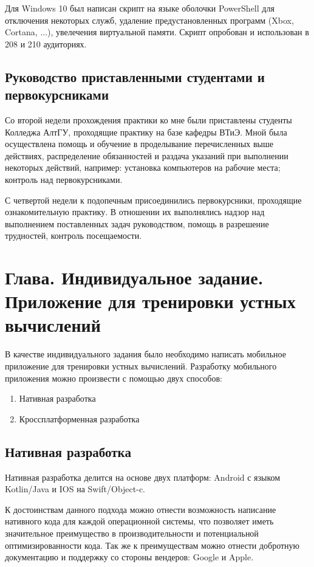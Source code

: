 \documentclass[14pt, oneside]{altsu-report}
\begin{document}
Для Windows 10 был написан скрипт на языке оболочки PowerShell для отключения некоторых служб, удаление предустановленных программ (Xbox, Cortana, ...), увелечения виртуальной памяти. Скрипт опробован и использован в 208 и 210 аудиториях.

\section{Руководство приставленными студентами и первокурсниками}
Со второй недели прохождения практики ко мне были приставлены студенты Колледжа АлтГУ, проходящие практику на базе кафедры ВТиЭ. Мной была осуществлена помощь и обучение в проделывание перечисленных выше действиях, распределение обязанностей и раздача указаний при выполнении некоторых действий, например: установка компьютеров на рабочие места; контроль над первокурсниками.

С четвертой недели к подопечным присоединились первокурсники, проходящие ознакомительную практику. В отношении их выполнялись надзор над выполнением поставленных задач руководством, помощь в разрешение трудностей, контроль посещаемости.

\chapter{Глава. Индивидуальное задание. Приложение для тренировки устных вычислений}
В качестве индивидуального задания было необходимо написать мобильное приложение для тренировки устных вычислений. 
Разработку мобильного приложения можно произвести с помощью двух способов:
\begin{enumerate}
  \item Нативная разработка \cite{nativDev}
  \item Кроссплатформенная разработка \cite{crosDev}
\end{enumerate}
\section*{Нативная разработка}
Нативная разработка делится на основе двух платформ: Android с языком Kotlin/Java и IOS на Swift/Object-c.

К достоинствам данного подхода можно отнести возможность написание нативного кода для каждой операционной системы, что позволяет иметь значительное преимущество в производительности и потенциальной оптимизированности кода. Так же к преимуществам можно отнести добротную документацию и поддержку со стороны вендеров: Google и Apple.
\end{document}
